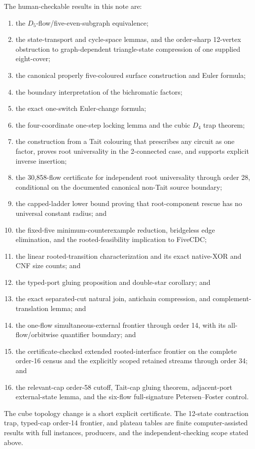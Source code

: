 \documentclass[11pt]{article}
\theoremstyle{definition}
\theoremstyle{remark}
\begin{document}
The human-checkable results in this note are:
\begin{enumerate}
 \item the \(D_5\)-flow/five-even-subgraph equivalence;
 \item the state-transport and cycle-space lemmas, and the order-sharp
 12-vertex obstruction to graph-dependent triangle-state compression of
 one supplied eight-cover;
 \item the canonical properly five-coloured surface construction and
 Euler formula;
 \item the boundary interpretation of the bichromatic factors;
 \item the exact one-switch Euler-change formula;
 \item the four-coordinate one-step locking lemma and the cubic \(D_4\)
 trap theorem;
 \item the construction from a Tait colouring that prescribes any circuit
 as one factor, proves root universality in the 2-connected case, and
 supports explicit inverse insertion;
 \item the 30,858-flow certificate for independent root universality through
 order 28, conditional on the documented canonical non-Tait source boundary;
 \item the capped-ladder lower bound proving that root-component rescue
 has no universal constant radius; and
 \item the fixed-five minimum-counterexample reduction, bridgeless
 edge elimination, and the rooted-feasibility implication to FiveCDC;
 \item the linear rooted-transition characterization and its exact
 native-XOR and CNF size counts; and
 \item the typed-port gluing proposition and double-star corollary; and
 \item the exact separated-cut natural join, antichain compression, and
 complement-translation lemma; and
 \item the one-flow simultaneous-external frontier through order 14,
 with its all-flow/orbitwise quantifier boundary; and
 \item the certificate-checked extended rooted-interface frontier on the
 complete order-16 census and the explicitly scoped retained streams through
 order 34; and
 \item the relevant-cap order-58 cutoff, Tait-cap gluing theorem,
 adjacent-port external-state lemma, and the six-flow full-signature
 Petersen--Foster control.
\end{enumerate}
The cube topology change is a short explicit certificate.  The
12-state contraction trap, typed-cap order-14 frontier, and plateau tables
are finite computer-assisted results with full instances, producers, and
the independent-checking scope stated above.
\end{document}
